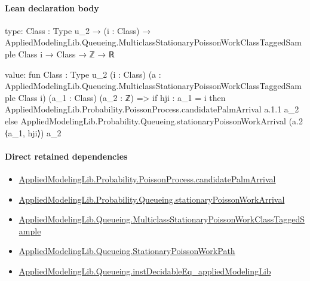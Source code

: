 \documentclass[10pt]{article}
\begin{document}
\paragraph{Lean declaration body}
\begin{ReviewVerbatim}
type:
{Class : Type u_2} →
  (i : Class) → AppliedModelingLib.Queueing.MulticlassStationaryPoissonWorkClassTaggedSample Class i → Class → ℤ → ℝ

value:
fun {Class : Type u_2} (i : Class)
    (a : AppliedModelingLib.Queueing.MulticlassStationaryPoissonWorkClassTaggedSample Class i) (a_1 : Class)
    (a_2 : ℤ) =>
  if hji : a_1 = i then AppliedModelingLib.Probability.PoissonProcess.candidatePalmArrival a.1.1 a_2
  else AppliedModelingLib.Probability.Queueing.stationaryPoissonWorkArrival (a.2 ⟨a_1, hji⟩) a_2
\end{ReviewVerbatim}

\paragraph{Direct retained dependencies}
\begin{itemize}\raggedright
\item \hyperlink{governing-declaration-9208635caa21f800}{Applied\allowbreak{}Modeling\allowbreak{}Lib.\allowbreak{}Probability.\allowbreak{}Poisson\allowbreak{}Process.\allowbreak{}candidate\allowbreak{}Palm\allowbreak{}Arrival}
\item \hyperlink{governing-declaration-499050173dfb71ee}{Applied\allowbreak{}Modeling\allowbreak{}Lib.\allowbreak{}Probability.\allowbreak{}Queueing.\allowbreak{}stationary\allowbreak{}Poisson\allowbreak{}Work\allowbreak{}Arrival}
\item \hyperlink{library-prerequisite-755cdb28ceaf46d2}{Applied\allowbreak{}Modeling\allowbreak{}Lib.\allowbreak{}Queueing.\allowbreak{}Multiclass\allowbreak{}Stationary\allowbreak{}Poisson\allowbreak{}Work\allowbreak{}Class\allowbreak{}Tagged\allowbreak{}Sample}
\item \hyperlink{governing-declaration-62a268164b6ae28b}{Applied\allowbreak{}Modeling\allowbreak{}Lib.\allowbreak{}Queueing.\allowbreak{}Stationary\allowbreak{}Poisson\allowbreak{}Work\allowbreak{}Path}
\item \hyperlink{governing-declaration-de954530ca750d3f}{Applied\allowbreak{}Modeling\allowbreak{}Lib.\allowbreak{}Queueing.\allowbreak{}inst\allowbreak{}Decidable\allowbreak{}Eq\_\allowbreak{}applied\allowbreak{}Modeling\allowbreak{}Lib}
\end{itemize}
\hypertarget{governing-declaration-2317cefa31cefbe1}{}
\end{document}
